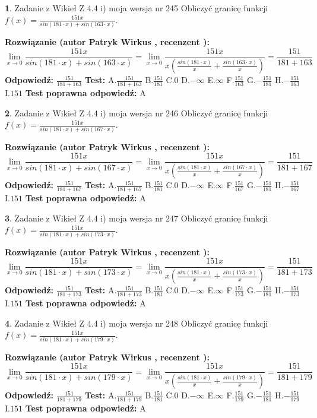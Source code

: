 \documentclass[12pt, a4paper]{article}
\theoremstyle{definition} %
\newtheorem{zad}{}
\newcommand{\zadStart}[1]{\begin{zad}#1\newline}
\newcommand{\zadStop}{\end{zad}}
\newcommand{\rozwStart}[2]{\noindent \textbf{Rozwiązanie (autor #1 , recenzent #2): }\newline}
\newcommand{\rozwStop}{\newline}
\newcommand{\odpStart}{\noindent \textbf{Odpowiedź:}\newline}
\newcommand{\odpStop}{\newline}
\newcommand{\testStart}{\noindent \textbf{Test:}\newline}
\newcommand{\testStop}{\newline}
\newcommand{\kluczStart}{\noindent \textbf{Test poprawna odpowiedź:}\newline}
\newcommand{\kluczStop}{\newline}
\begin{document}
\zadStart{Zadanie z Wikieł Z 4.4 i) moja wersja nr 245}
Obliczyć granicę funkcji $f(x)=\frac{151x}{sin(181\cdot x) +sin(163\cdot x)}$.
\zadStop
\rozwStart{Patryk Wirkus}{}
$$\lim\limits_{x\to 0}\frac{151x}{sin(181\cdot x) +sin(163\cdot x)}=\lim\limits_{x\to 0}\frac{151x}{x(\frac{sin(181\cdot x)}{x}+\frac{sin(163\cdot x)}{x})}=\frac{151}{181+163}$$
\rozwStop
\odpStart
$\frac{151}{181+163}$
\odpStop
\testStart
A.$\frac{151}{181+163}$
B.$\frac{151}{181}$
C.$0$
D.$-\infty$
E.$\infty$
F.$\frac{151}{163}$
G.$-\frac{151}{181}$
H.$-\frac{151}{163}$
I.$151$
\testStop
\kluczStart
A
\kluczStop



\zadStart{Zadanie z Wikieł Z 4.4 i) moja wersja nr 246}
Obliczyć granicę funkcji $f(x)=\frac{151x}{sin(181\cdot x) +sin(167\cdot x)}$.
\zadStop
\rozwStart{Patryk Wirkus}{}
$$\lim\limits_{x\to 0}\frac{151x}{sin(181\cdot x) +sin(167\cdot x)}=\lim\limits_{x\to 0}\frac{151x}{x(\frac{sin(181\cdot x)}{x}+\frac{sin(167\cdot x)}{x})}=\frac{151}{181+167}$$
\rozwStop
\odpStart
$\frac{151}{181+167}$
\odpStop
\testStart
A.$\frac{151}{181+167}$
B.$\frac{151}{181}$
C.$0$
D.$-\infty$
E.$\infty$
F.$\frac{151}{167}$
G.$-\frac{151}{181}$
H.$-\frac{151}{167}$
I.$151$
\testStop
\kluczStart
A
\kluczStop



\zadStart{Zadanie z Wikieł Z 4.4 i) moja wersja nr 247}
Obliczyć granicę funkcji $f(x)=\frac{151x}{sin(181\cdot x) +sin(173\cdot x)}$.
\zadStop
\rozwStart{Patryk Wirkus}{}
$$\lim\limits_{x\to 0}\frac{151x}{sin(181\cdot x) +sin(173\cdot x)}=\lim\limits_{x\to 0}\frac{151x}{x(\frac{sin(181\cdot x)}{x}+\frac{sin(173\cdot x)}{x})}=\frac{151}{181+173}$$
\rozwStop
\odpStart
$\frac{151}{181+173}$
\odpStop
\testStart
A.$\frac{151}{181+173}$
B.$\frac{151}{181}$
C.$0$
D.$-\infty$
E.$\infty$
F.$\frac{151}{173}$
G.$-\frac{151}{181}$
H.$-\frac{151}{173}$
I.$151$
\testStop
\kluczStart
A
\kluczStop



\zadStart{Zadanie z Wikieł Z 4.4 i) moja wersja nr 248}
Obliczyć granicę funkcji $f(x)=\frac{151x}{sin(181\cdot x) +sin(179\cdot x)}$.
\zadStop
\rozwStart{Patryk Wirkus}{}
$$\lim\limits_{x\to 0}\frac{151x}{sin(181\cdot x) +sin(179\cdot x)}=\lim\limits_{x\to 0}\frac{151x}{x(\frac{sin(181\cdot x)}{x}+\frac{sin(179\cdot x)}{x})}=\frac{151}{181+179}$$
\rozwStop
\odpStart
$\frac{151}{181+179}$
\odpStop
\testStart
A.$\frac{151}{181+179}$
B.$\frac{151}{181}$
C.$0$
D.$-\infty$
E.$\infty$
F.$\frac{151}{179}$
G.$-\frac{151}{181}$
H.$-\frac{151}{179}$
I.$151$
\testStop
\kluczStart
A
\kluczStop
\end{document}
